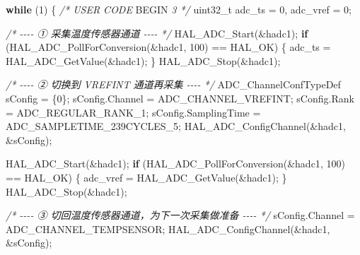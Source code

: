 \documentclass[
  chinese,
  UTF8,
  oneside,
  openany]{ctexbook}
\newenvironment{Shaded}{}{}
\newcommand{\CommentTok}[1]{\textcolor[rgb]{0.38,0.63,0.69}{\textit{#1}}}
\newcommand{\ControlFlowTok}[1]{\textcolor[rgb]{0.00,0.44,0.13}{\textbf{#1}}}
\newcommand{\DataTypeTok}[1]{\textcolor[rgb]{0.56,0.13,0.00}{#1}}
\newcommand{\DecValTok}[1]{\textcolor[rgb]{0.25,0.63,0.44}{#1}}
\newcommand{\NormalTok}[1]{#1}
\newcommand{\OperatorTok}[1]{\textcolor[rgb]{0.40,0.40,0.40}{#1}}
\newcommand{\RegionMarkerTok}[1]{#1}
\begin{document}
\begin{Shaded}
\begin{Highlighting}[]
\ControlFlowTok{while} \OperatorTok{(}\DecValTok{1}\OperatorTok{)}
\OperatorTok{\{}
    \CommentTok{/* USER CODE }\RegionMarkerTok{BEGIN}\CommentTok{ 3 */}
    \DataTypeTok{uint32\_t}\NormalTok{ adc\_ts }\OperatorTok{=} \DecValTok{0}\OperatorTok{,}\NormalTok{ adc\_vref }\OperatorTok{=} \DecValTok{0}\OperatorTok{;}

    \CommentTok{/* {-}{-}{-}{-} ① 采集温度传感器通道 {-}{-}{-}{-} */}
\NormalTok{    HAL\_ADC\_Start}\OperatorTok{(\&}\NormalTok{hadc1}\OperatorTok{);}
    \ControlFlowTok{if} \OperatorTok{(}\NormalTok{HAL\_ADC\_PollForConversion}\OperatorTok{(\&}\NormalTok{hadc1}\OperatorTok{,} \DecValTok{100}\OperatorTok{)} \OperatorTok{==}\NormalTok{ HAL\_OK}\OperatorTok{)}
    \OperatorTok{\{}
\NormalTok{        adc\_ts }\OperatorTok{=}\NormalTok{ HAL\_ADC\_GetValue}\OperatorTok{(\&}\NormalTok{hadc1}\OperatorTok{);}
    \OperatorTok{\}}
\NormalTok{    HAL\_ADC\_Stop}\OperatorTok{(\&}\NormalTok{hadc1}\OperatorTok{);}

    \CommentTok{/* {-}{-}{-}{-} ② 切换到 VREFINT 通道再采集 {-}{-}{-}{-} */}
\NormalTok{    ADC\_ChannelConfTypeDef sConfig }\OperatorTok{=} \OperatorTok{\{}\DecValTok{0}\OperatorTok{\};}
\NormalTok{    sConfig}\OperatorTok{.}\NormalTok{Channel }\OperatorTok{=}\NormalTok{ ADC\_CHANNEL\_VREFINT}\OperatorTok{;}
\NormalTok{    sConfig}\OperatorTok{.}\NormalTok{Rank }\OperatorTok{=}\NormalTok{ ADC\_REGULAR\_RANK\_1}\OperatorTok{;}
\NormalTok{    sConfig}\OperatorTok{.}\NormalTok{SamplingTime }\OperatorTok{=}\NormalTok{ ADC\_SAMPLETIME\_239CYCLES\_5}\OperatorTok{;}
\NormalTok{    HAL\_ADC\_ConfigChannel}\OperatorTok{(\&}\NormalTok{hadc1}\OperatorTok{,} \OperatorTok{\&}\NormalTok{sConfig}\OperatorTok{);}

\NormalTok{    HAL\_ADC\_Start}\OperatorTok{(\&}\NormalTok{hadc1}\OperatorTok{);}
    \ControlFlowTok{if} \OperatorTok{(}\NormalTok{HAL\_ADC\_PollForConversion}\OperatorTok{(\&}\NormalTok{hadc1}\OperatorTok{,} \DecValTok{100}\OperatorTok{)} \OperatorTok{==}\NormalTok{ HAL\_OK}\OperatorTok{)}
    \OperatorTok{\{}
\NormalTok{        adc\_vref }\OperatorTok{=}\NormalTok{ HAL\_ADC\_GetValue}\OperatorTok{(\&}\NormalTok{hadc1}\OperatorTok{);}
    \OperatorTok{\}}
\NormalTok{    HAL\_ADC\_Stop}\OperatorTok{(\&}\NormalTok{hadc1}\OperatorTok{);}

    \CommentTok{/* {-}{-}{-}{-} ③ 切回温度传感器通道，为下一次采集做准备 {-}{-}{-}{-} */}
\NormalTok{    sConfig}\OperatorTok{.}\NormalTok{Channel }\OperatorTok{=}\NormalTok{ ADC\_CHANNEL\_TEMPSENSOR}\OperatorTok{;}
\NormalTok{    HAL\_ADC\_ConfigChannel}\OperatorTok{(\&}\NormalTok{hadc1}\OperatorTok{,} \OperatorTok{\&}\NormalTok{sConfig}\OperatorTok{);}


\end{Highlighting}
\end{Shaded}
\end{document}
